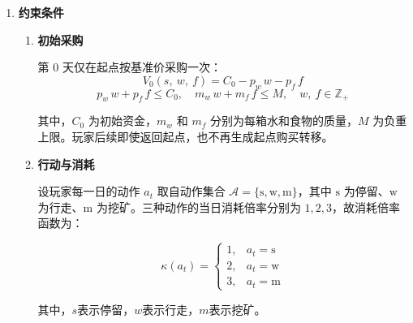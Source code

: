 \documentclass{cumcmthesis}
\numberwithin{equation}{section}
\numberwithin{figure}{section}
\numberwithin{table}{section}
\begin{document}
\begin{enumerate}
\hspace*{2em}
其中，$Z$ 为终端总财富；$C_\tau$ 为到达终点当天的现金；$W_\tau$ 和 $F_\tau$ 为终点库存；$p_w$ 和 $p_f$ 分别为水和食物的基准价格。采用价值函数后，最终目标写为：
\vspace{-8pt}
\begin{equation}
Z^* = \max_{0 \leq t \leq T,\ w,\ f} \Bigl\{ V_t(g,\ w,\ f) + 0.5\,p_w\,w + 0.5\,p_f\,f \Bigr\}
\end{equation}

        \item\textbf{约束条件} 
        

        \begin{enumerate}
            \item\textbf{ 初始采购}
            
             \hspace*{2em}第 0 天仅在起点按基准价采购一次：
\vspace{-10pt}
\begin{equation}
V_0(s,\ w,\ f) = C_0 - p_w\,w - p_f\,f
\label{eq:q1_init}
\end{equation}
\vspace{-18pt}
\begin{equation}
p_w\,w + p_f\,f \leq C_0,\quad m_w\,w + m_f\,f \leq M,\quad w,\ f \in \mathbb{Z}_+
\label{eq:q1_initcon}
\end{equation}

其中，$C_0$ 为初始资金，$m_w$ 和 $m_f$ 分别为每箱水和食物的质量，$M$ 为负重上限。玩家后续即使返回起点，也不再生成起点购买转移。

            \item \textbf{行动与消耗}

            \hspace*{2em}设玩家每一日的动作 $a_t$ 取自动作集合 $\mathcal{A}=\{\mathrm{s},\mathrm{w},\mathrm{m}\}$，其中 $\mathrm{s}$ 为停留、$\mathrm{w}$ 为行走、$\mathrm{m}$ 为挖矿。三种动作的当日消耗倍率分别为 $1,2,3$，故消耗倍率函数为：

\vspace{-10pt}
\begin{equation}
\kappa(a_t) = \begin{cases}
1, & a_t = \mathrm{s} \\
2, & a_t = \mathrm{w} \\
3, & a_t = \mathrm{m}
\end{cases}
\label{eq:q1_kappa}
\end{equation}

\hspace*{2em}其中，$s$表示停留，$w$表示行走，$m$表示挖矿。


\end{enumerate}
\end{enumerate}
\end{document}
